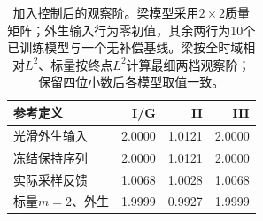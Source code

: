 \begin{table}[t]
\centering\small\setlength{\tabcolsep}{4pt}
\caption{加入控制后的观察阶。梁模型采用$2\times2$质量矩阵；外生输入行为零初值，其余两行为10个已训练模型与一个无补偿基线。梁按全时域相对$L^2$、标量按终点$L^2$计算最细两档观察阶；保留四位小数后各模型取值一致。}
\label{tab:controlled_convergence}
\begin{tabular}{lrrr}
\toprule
参考定义 & I/G & II & III \\
\midrule
光滑外生输入 & 2.0000 & 1.0121 & 2.0000 \\
冻结保持序列 & 2.0000 & 1.0121 & 2.0000 \\
实际采样反馈 & 1.0068 & 1.0028 & 1.0068 \\
标量$m=2$、外生 & 1.9999 & 0.9927 & 1.9999 \\
\bottomrule
\end{tabular}
\end{table}
